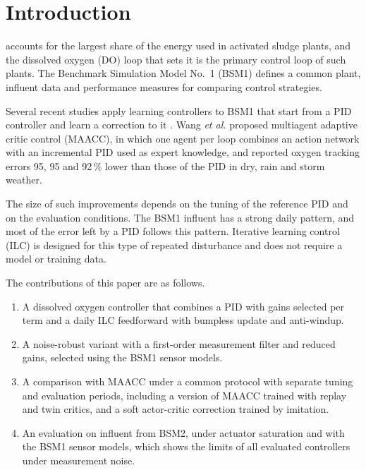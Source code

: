 \documentclass[journal]{IEEEtran}
\begin{document}
\section{Introduction}

 accounts for the largest share of the energy used
in activated sludge plants, and the dissolved oxygen (DO) loop that sets it
is the primary control loop of such plants. The Benchmark Simulation Model
No.~1 (BSM1) \cite{alex2008bsm1,gernaey2014benchmarking} defines a common
plant, influent data and performance measures for comparing control
strategies.

Several recent studies apply learning controllers to BSM1 that start from a
PID controller and learn a correction to it
\cite{wang2026maacc,zhao2025ioql,du2023do}. Wang \emph{et al.}
\cite{wang2026maacc} proposed multiagent adaptive critic control (MAACC), in
which one agent per loop combines an action network with an incremental PID
used as expert knowledge, and reported oxygen tracking errors 95, 95 and
92\,\% lower than those of the PID in dry, rain and storm weather.

The size of such improvements depends on the tuning of the reference PID and
on the evaluation conditions. The BSM1 influent has a strong daily pattern,
and most of the error left by a PID follows this pattern. Iterative learning
control (ILC) \cite{arimoto1984ilc,bristow2006ilc} is designed for this type
of repeated disturbance and does not require a model or training data.

The contributions of this paper are as follows.
\begin{enumerate}
\item A dissolved oxygen controller that combines a PID with gains selected
  per term and a daily ILC feedforward with bumpless update and anti-windup.
\item A noise-robust variant with a first-order measurement filter and
  reduced gains, selected using the BSM1 sensor models.
\item A comparison with MAACC \cite{wang2026maacc} under a common protocol
  with separate tuning and evaluation periods, including a version of MAACC
  trained with replay and twin critics, and a soft actor-critic correction
  trained by imitation.
\item An evaluation on influent from BSM2, under actuator saturation and with
  the BSM1 sensor models, which shows the limits of all evaluated
  controllers under measurement noise.
\end{enumerate}
\end{document}
